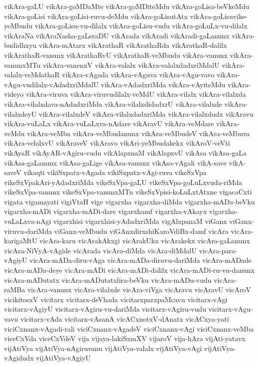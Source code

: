 {vikAra-gaLU
vikAra-goMDaMte
vikAra-goMDiteMdu
vikAra-goLisa-beVkeMdu
vikAra-goLisi
vikAra-goLisi-ruvu-deMdu
vikAra-goLisutAtx
vikAra-goLisuvike-yeMbudu
vikAra-goLisu-vu-dilalx
vikAra-goLisu-vudu
vikAra-goLuLx-vu-dilalx
vikAraNa
vikAraNasha-gaLeraDU
vikArada
vikAradi
vikAradi-gaLanunx
vikAra-budidhxyu
vikAra-mAtarx
vikArathaR
vikArathaRda
vikArathaR-dalilx
vikArathaR-vanunx
vikArathaRvU
vikArathaR-veMbudu
vikAra-vanunx
vikAra-vanunxMTu
vikAra-vanenxV
vikAra-valalx
vikAra-valalxdadxriMdalU
vikAra-valalx-veMdathaR
vikAra-vAgada
vikAra-vAguva
vikAra-vAgu-vavo
vikAra-vAgu-vudilalx-vAdadxriMdalU
vikAra-vAdadxriMda
vikAra-vAyiteMdu
vikAra-videyo
vikAra-viruva
vikAra-viruvudilalx-veMdU
vikAra-vilalx
vikAra-vilalxda
vikAra-vilalxdava-nAdadxriMda
vikAra-vilalxdidadxrU
vikAra-vilalxde
vikAra-vilalxdeyU
vikAra-vilalxdeV
vikAra-vilalxdadxriMda
vikAra-vilalxdudx
vikAravu
vikAra-vuLaLx
vikAra-vuLaLxva-nAdare
vikAravU
vikAra-veMdare
vikAra-veMdu
vikAra-veMba
vikAra-veMbudanunx
vikAra-veMbudeV
vikAra-veMbuva
vikAra-velalxvU
vikAraveV
vikAravo
vikAri-yeMbudakekx
vikAroV-veVti
vikAyaR
vikAyAR-vAgiru-vudu
vikAlapxnaM
vikAlapxvU
vikAsa
vikAsa-gaLa
vikAsa-gaLanunx
vikAsa-gaLige
vikAsa-vanunx
vikAsa-vAgali
vikA-save
vikA-saveV
vikaqti
vikiSxpatx-vAgada
vikiSxpatx-vAgi-ruva
vikeSxVpa
vikeSxVpakAri-yAdadxriMda
vikeSxVpa-gaLU
vikeSxVpa-goLuLxvuda-riMda
vikeSxVpa-vanunx
vikeSxVpa-vanunxMTu
vikeSxVpisi-koLuLxtAtxne
vigacaCxti
vigata
vigamayati
vigiVtaH
vige
vigarxha
vigarxha-diMda
vigarxha-mADa-beVku
vigarxha-mADi
vigarxha-mADi-dare
vigarxhamf
vigarxha-vAkayx
vigarxha-vuLaLxva-nAgi
vigarxhisi
vigarxhisi-yAdadxriMda
vigAlxpanaM
viGanx
viGanx-viruvu-dariMda
viGanx-veMbudu
viGAnxdirxshiKaroVdiBx-damf
vicAra
vicAra-karigaMtU
vicAra-karu
vicArakAkxgi
vicArakUkx
vicArakekx
vicAra-gaLanunx
vicAra-NiVyA-vAgide
vicArada
vicAra-diMda
vicAra-diMdalU
vicAra-para-vAgiyU
vicAra-mADa-diru-vAga
vicAra-mADa-diruvu-dariMda
vicAra-mADade
vicAra-mADa-deye
vicAra-mADi
vicAra-mADi-dalilx
vicAra-mADi-ru-vu-danunx
vicAra-mADutatx
vicAra-mADutatxlira-beVku
vicAra-mADu-vudu
vicAra-raMBa
vicAra-vanunx
vicAra-vilalxde
vicAra-viVga
vicAravu
vicAravU
vicAroV
vicikitosxV
vicitarx
vicitarx-deVhada
vicitarxparxpaMcavu
vicitarx-vAgi
vicitarx-vAgiyU
vicitarx-vAgiru-vu-dariMda
vicitarx-vAgiru-vudu
vicitarx-vAgu-vavu
vicitarx-vAda
vicitarx-vAsanA
vicACxnotxV-dAnatx
vicACxya-yati
viciCxnanx-vAgadi-rali
viciCxnanx-vAgadeV
viciCxnanx-vAgi
viciCxnanx-veMba
viceCxVda
viceCxVdeV
vija
vijaya-lakiSxmXV
vijaroV
vija-hAra
vijAti-yatavx
vijAtiVya
vijAtiVya-nAgiruvanu
vijAtiVya-valalx
vijAtiVya-vAgi
vijAtiVya-vAgidudx
vijAtiVya-vAgiyU
}
